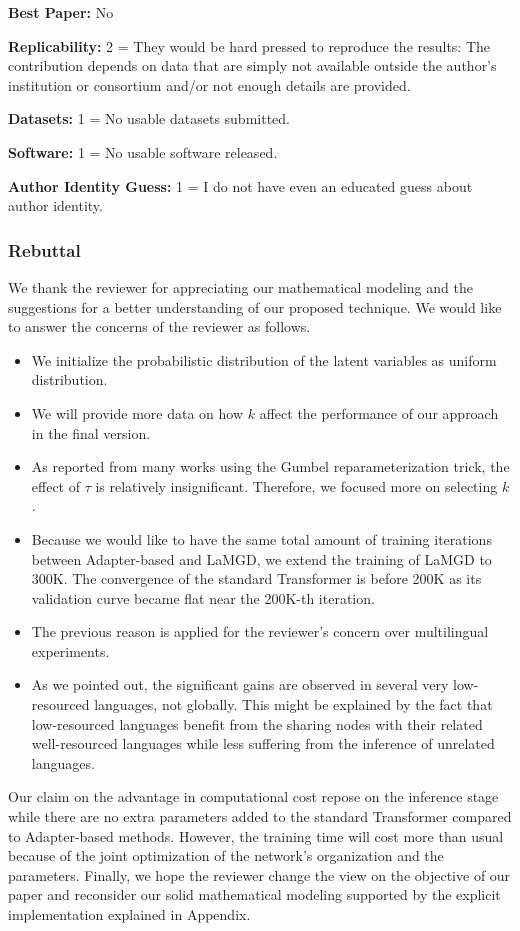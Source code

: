 \documentclass[12pt,times,a4paper,twoside]{article}
\theoremstyle{definition}
\begin{document}
\textbf{Best Paper:} No

\textbf{Replicability:} 2 = They would be hard pressed to reproduce the results: The contribution depends on data that are simply not available outside the author's institution or consortium and/or not enough details are provided.

\textbf{Datasets:} 1 = No usable datasets submitted.

\textbf{Software:} 1 = No usable software released.

\textbf{Author Identity Guess:} 1 = I do not have even an educated guess about author identity.

\subsubsection*{Rebuttal}
{\color{blue}%
We thank the reviewer for appreciating our mathematical modeling and the suggestions for a better understanding of our proposed technique. We would like to answer the concerns of the reviewer as follows.

\begin{itemize}
\item We initialize the probabilistic distribution of the latent variables as uniform distribution.
\item We will provide more data on how $k$ affect the performance of our approach in the final version.
\item As reported from many works using the Gumbel reparameterization trick, the effect of $\tau$ is relatively insignificant. Therefore, we focused more on selecting $k$.
\item Because we would like to have the same total amount of training iterations between Adapter-based and LaMGD, we extend the training of LaMGD to 300K. The convergence of the standard Transformer is before 200K as its validation curve became flat near the 200K-th iteration.
\item The previous reason is applied for the reviewer's concern over multilingual experiments.
\item As we pointed out, the significant gains are observed in several very low-resourced languages, not globally. This might be explained by the fact that low-resourced languages benefit from the sharing nodes with their related well-resourced languages while less suffering from the inference of unrelated languages.
\end{itemize}
Our claim on the advantage in computational cost repose on the inference stage while there are no extra parameters added to the standard Transformer compared to Adapter-based methods. However, the training time will cost more than usual because of the joint optimization of the network's organization and the parameters. Finally, we hope the reviewer change the view on the objective of our paper and reconsider our solid mathematical modeling supported by the explicit implementation explained in Appendix.
}%
\end{document}
